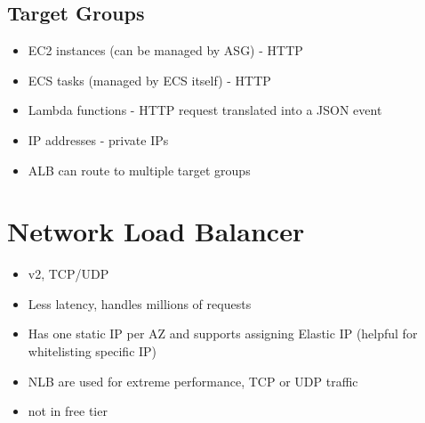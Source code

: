 \documentclass[]{scrartcl}
\begin{document}
\subsection{Target Groups}
\begin{itemize}
	\item EC2 instances (can be managed by ASG) - HTTP
	\item ECS tasks (managed by ECS itself) - HTTP
	\item Lambda functions - HTTP request translated into a JSON event
	\item IP addresses - private IPs
	\item ALB can route to multiple target groups
\end{itemize}

\section{Network Load Balancer}
\begin{itemize}
	\item v2, TCP/UDP
	\item Less latency, handles millions of requests
	\item Has one static IP per AZ and supports assigning Elastic IP (helpful for whitelisting specific IP)
	\item NLB are used for extreme performance, TCP or UDP traffic
	\item not in free tier
\end{itemize}
\end{document}
